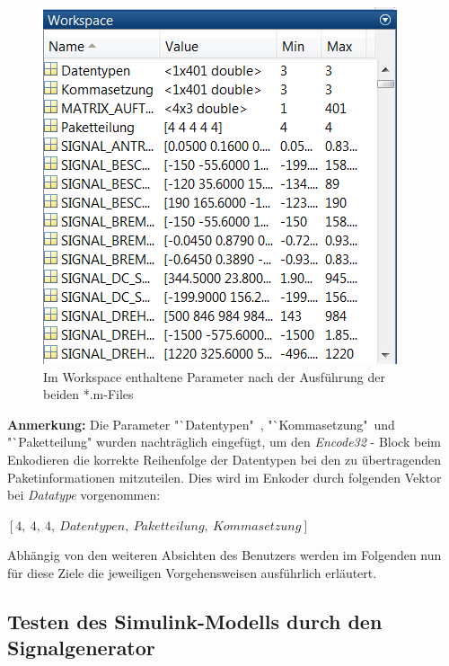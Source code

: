 \documentclass[fontsize = 12pt, paper = a4]{scrreprt}
\begin{document}
\begin{figure}[h]
\centering
\includegraphics[scale = 0.65]{configfilesworkspace}
\caption[Parameter im Workspace]{Im Workspace enthaltene Parameter nach der Ausführung der beiden *.m-Files}
\label{configfilesworkspace}
\end{figure}  

\newpage

\textbf{Anmerkung:} Die Parameter "`Datentypen"\ , "`Kommasetzung"\ und "`Paketteilung" wurden nachträglich eingefügt, um den \textit{Encode32} - Block beim Enkodieren die korrekte Reihenfolge der Datentypen bei den zu übertragenden Paketinformationen mitzuteilen. Dies wird im Enkoder durch folgenden Vektor bei \textit{Datatype} vorgenommen: 

\begin{center}
$[ 4, \ 4, \ 4, \ Datentypen, \ Paketteilung, \ Kommasetzung ]$ 
\end{center}


 



Abhängig von den weiteren Absichten des Benutzers werden im Folgenden nun für diese Ziele die jeweiligen Vorgehensweisen ausführlich erläutert. 

\subsection{Testen des Simulink-Modells durch den Signalgenerator}
\end{document}
